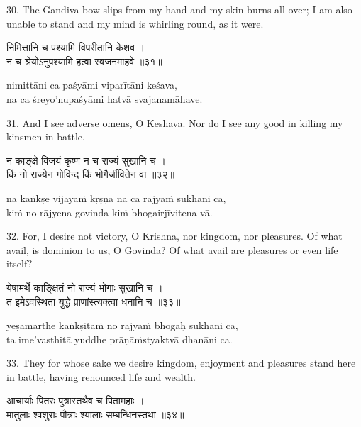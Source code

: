 30. The Gandiva-bow slips from my hand and my skin burns all over; I am also
unable to stand and my mind is whirling round, as it were.

\begin{gitaverse}
निमित्तानि च पश्यामि विपरीतानि केशव । \\
न च श्रेयोऽनुपश्यामि हत्वा स्वजनमाहवे ॥३१॥
\end{gitaverse}

\begin{transliteration}
nimittāni ca paśyāmi viparītāni keśava, \\
na ca śreyo'nupaśyāmi hatvā svajanamāhave.
\end{transliteration}

31. And I see adverse omens, O Keshava. Nor do I see any good in killing my
kinsmen in battle.

\begin{gitaverse}
न काङ्क्षे विजयं कृष्ण न च राज्यं सुखानि च । \\
किं नो राज्येन गोविन्द किं भोगैर्जीवितेन वा ॥३२॥
\end{gitaverse}

\begin{transliteration}
na kāṅkṣe vijayaṁ kṛṣṇa na ca rājyaṁ sukhāni ca, \\
kiṁ no rājyena govinda kiṁ bhogairjīvitena vā.
\end{transliteration}

32. For, I desire not victory, O Krishna, nor kingdom, nor pleasures. Of what
avail, is dominion to us, O Govinda? Of what avail are pleasures or even life
itself?

\begin{gitaverse}
येषामर्थे काङ्क्षितं नो राज्यं भोगाः सुखानि च । \\
त इमेऽवस्थिता युद्धे प्राणांस्त्यक्त्वा धनानि च ॥३३॥
\end{gitaverse}

\begin{transliteration}
yeṣāmarthe kāṅkṣitaṁ no rājyaṁ bhogāḥ sukhāni ca, \\
ta ime'vasthitā yuddhe prāṇāṁstyaktvā dhanāni ca.
\end{transliteration}

33. They for whose sake we desire kingdom, enjoyment and pleasures stand here
in battle, having renounced life and wealth.

\begin{gitaverse}
आचार्याः पितरः पुत्रास्तथैव च पितामहाः । \\
मातुलाः श्वशुराः पौत्राः श्यालाः सम्बन्धिनस्तथा ॥३४॥
\end{gitaverse}

